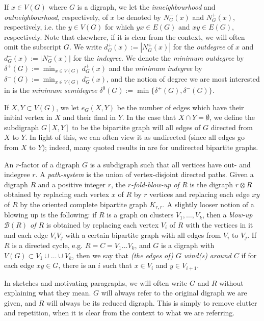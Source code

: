 \documentclass[10pt,letterpaper, reqno]{amsart}
\theoremstyle{definition}
\numberwithin{equation}{section}
\begin{document}
If $x \in V(G)$ where $G$ is a digraph, we let the \textit{inneighbourhood} and \textit{outneighbourhood}, respectively, of $x$ be denoted by $N_G^-(x)$ and $N_G^+(x)$, respectively, i.e. the $y \in V(G)$ for which $yx \in E(G)$ and $xy \in E(G)$, respectively. Note that  elsewhere, if it is clear from the context, we will often omit the subscript $G$. We write $d^+_G(x) := |N_G^+(x)|$ for the \textit{outdegree} of $x$ and $d^-_G(x) := |N_G^-(x)|$ for the \textit{indegree}. We denote the \textit{minimum outdegree} by $\delta^+(G) := \min_{x \in V(G)}d^+_G(x)$ and the \textit{minimum indegree} by $\delta^-(G) := \min_{x \in V(G)}d^-_G(x)$, and the notion of degree we are most interested in is the \textit{minimum semidegree} $\delta^0(G) := \min\{\delta^+(G), \delta^-(G)\}$.

If $X,Y \subset V(G)$, we let $e_G(X,Y)$ be the number of edges which have their initial vertex in $X$ and their final in $Y$. In the case that $X \cap Y = \emptyset$, we define the subdigraph $G[X,Y]$ to be the bipartite graph will all edges of $G$ directed from $X$ to $Y$. In light of this, we can often view it as undirected (since all edges go from $X$ to $Y$); indeed, many quoted results in \cite{HamiltonDecomp} are for undirected bipartite graphs. 

An \textit{$r$}-factor of a digraph $G$ is a subdigraph such that all vertices have out- and indegree $r$. A \textit{path-system} is the union of vertex-disjoint directed paths. Given a digraph $R$ and a positive integer $r$, the \textit{$r$-fold-blow-up of $R$} is the digraph $r \otimes R$ obtained by replacing each vertex $x$ of $R$ by $r$ vertices and replacing each edge $xy$ of $R$ by the oriented complete bipartite graph $K_{r,r}$. A slightly looser notion of a blowing up is the following: if $R$ is a graph on clusters $V_1,\dots,V_k$, then a \textit{blow-up $\mathcal{B}(R)$ of $R$} is obtained by replacing each vertex $V_i$ of $R$ with the vertices in it and each edge $V_iV_j$ with a certain bipartite graph with all edges from $V_i$ to $V_j$. If $R$ is a directed cycle, e.g. $R=C=V_1\dots V_k$, and $G$ is a digraph with $V(G) \subset V_1 \cup \dots \cup V_k$, then we say that \textit{(the edges of) $G$ wind(s) around $C$} if for each edge $xy \in G$, there is an $i$ such that $x \in V_i$ and $y \in V_{i+1}$. 

In sketches and motivating paragraphs, we will often write $G$ and $R$ without explaining what they mean. $G$ will always refer to the original digraph we are given, and $R$ will always be its reduced digraph. This is simply to remove clutter and repetition, when it is clear from the context to what we are referring. 
\end{document}
